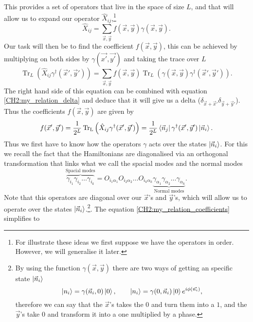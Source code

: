 \indent This provides a set of operators that live in the space of size $L$, and that will allow us to expand our operator $\hat{X}_{ij}$,\footnote{For illustrate these ideas we first suppose we have the operators in order. However, we will generalise it later.}
\begin{equation}
\hat{X}_{ij} = \sum_{\vec{x},\vec{y}} f(\vec{x},\vec{y})\gamma(\vec{x},\vec{y}).
\end{equation}
Our task will then be to find the coefficient $f(\vec{x},\vec{y})$, this can be achieved by multiplying on both sides by $\gamma(\vec{x'},\vec{y'})$ and taking the trace over $L$
\begin{equation}
\operatorname{Tr}_L\left(\hat{X}_{ij}\gamma^{\dagger}(\vec{x}',\vec{y}')\right)=\sum_{\vec{x},\vec{y}}f(\vec{x},\vec{y}) \operatorname{Tr}_L\left(\gamma(\vec{x},\vec{y})\gamma^{\dagger}(\vec{x}',\vec{y}')\right).
\end{equation}
The right hand side of this equation can be combined with equation \eqref{CH2:my_relation_delta} and deduce that it will give us a delta ($\delta_{\vec{x}+\vec{x}'}\delta_{\vec{y}+\vec{y}'}$). Thus the coefficients $f(\vec{x},\vec{y})$ are given by
\begin{equation}
f(\vec{x}',\vec{y}') = \frac{1}{2^L}\operatorname{Tr_L}\left(\hat{X}_{ij}\gamma^{\dagger}(\vec{x}',\vec{y}')\right)=\frac{1}{2^L} \mathinner{\langle{\vec{n}_j}|}\gamma^{\dagger}(\vec{x}',\vec{y}')\mathinner{|{\vec{n}_i}\rangle}.
\label{CH2:my_relation_coefficients}
\end{equation}
\indent Thus we first have to know how the operators $\gamma$ acts over the states $\mathinner{|{\vec{n}_i}\rangle}$. For this we recall the fact that the Hamiltonians are diagonalised via an orthogonal transformation that links what we call the spacial modes and the normal modes
\begin{equation}
\overbrace{\gamma_{i_1}\gamma_{i_2}\ldots\gamma_{i_k}}^{\text{Spacial modes}}= O_{i_1\alpha_1}O_{i_2\alpha_2}\ldots O_{i_k\alpha_k} \underbrace{\gamma_{\alpha_1}\gamma_{\alpha_2}\ldots\gamma_{\alpha_k}}_{\text{Normal modes}}.
\end{equation}
\indent Note that this operators are diagonal over our $\vec{x}$'s and $\vec{y}$'s, which will allow us to operate over the states $\mathinner{|{\vec{n}_i}\rangle}$.\footnote{By using the function $\gamma(\vec{x},\vec{y})$ there are two ways of getting an specific state $\mathinner{|{\vec{n}_i}\rangle}$
\begin{equation}
\mathinner{|{n_i}\rangle}=\gamma(\vec{n}_i,0)\mathinner{|{0}\rangle}, \qquad \mathinner{|{n_i}\rangle}=\gamma(0,\vec{n}_i)\mathinner{|{0}\rangle}e^{i\phi(\vec{n_i})},
\end{equation}
therefore we can say that the $\vec{x}$'s takes the $0$ and turn them into a $1$, and the $\vec{y}$'s take $0$ and transform it into a one multiplied by a phase.
}. The equation \eqref{CH2:my_relation_coefficients} simplifies to
